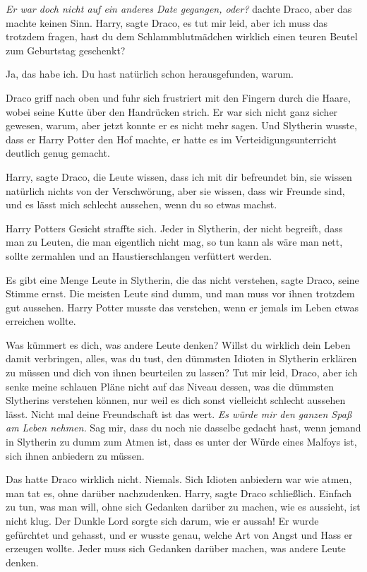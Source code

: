 \emph{Er war doch nicht auf ein anderes Date gegangen, oder? }dachte Draco, aber
das machte keinen Sinn. \glqq Harry\grqq{}, sagte Draco, \glqq es tut mir leid,
aber ich muss das trotzdem fragen, hast du dem Schlammblutmädchen wirklich einen
teuren Beutel zum Geburtstag geschenkt?\grqq{}

\glqq Ja, das habe ich. Du hast natürlich schon herausgefunden, warum.\grqq{}

Draco griff nach oben und fuhr sich frustriert mit den Fingern durch die Haare,
wobei seine Kutte über den Handrücken strich. Er war sich nicht ganz sicher
gewesen, warum, aber jetzt konnte er es nicht mehr sagen. Und Slytherin wusste,
dass er Harry Potter den Hof machte, er hatte es im Verteidigungsunterricht
deutlich genug gemacht.

\glqq Harry\grqq{}, sagte Draco, \glqq die Leute wissen, dass ich mit dir
befreundet bin, sie wissen natürlich nichts von der Verschwörung, aber sie
wissen, dass wir Freunde sind, und es lässt mich schlecht aussehen, wenn du so
etwas machst.\grqq{}

Harry Potters Gesicht straffte sich. \glqq Jeder in Slytherin, der nicht
begreift, dass man zu Leuten, die man eigentlich nicht mag, so tun kann als wäre
man nett, sollte zermahlen und an Haustierschlangen verfüttert werden.\grqq{}

\glqq Es gibt eine Menge Leute in Slytherin, die das nicht verstehen\grqq{},
sagte Draco, seine Stimme ernst. \glqq Die meisten Leute sind dumm, und man muss
vor ihnen trotzdem gut aussehen.\grqq{} Harry Potter musste das verstehen, wenn
er jemals im Leben etwas erreichen wollte.

\glqq Was kümmert es dich, was andere Leute denken? Willst du wirklich dein
Leben damit verbringen, alles, was du tust, den dümmsten Idioten in Slytherin
erklären zu müssen und dich von ihnen beurteilen zu lassen? Tut mir leid, Draco,
aber ich senke meine schlauen Pläne nicht auf das Niveau dessen, was die
dümmsten Slytherins verstehen können, nur weil es dich sonst vielleicht schlecht
aussehen lässt. Nicht mal deine Freundschaft ist das wert. \emph{Es würde mir
den ganzen Spaß am Leben nehmen.} Sag mir, dass du noch nie dasselbe gedacht
hast, wenn jemand in Slytherin zu dumm zum Atmen ist, dass es unter der Würde
eines Malfoys ist, sich ihnen anbiedern zu müssen.\grqq{}

Das hatte Draco wirklich nicht. Niemals. Sich Idioten anbiedern war wie atmen,
man tat es, ohne darüber nachzudenken. \glqq Harry\grqq{}, sagte Draco
schließlich. \glqq Einfach zu tun, was man will, ohne sich Gedanken darüber zu
machen, wie es aussieht, ist nicht klug. Der Dunkle Lord sorgte sich darum, wie
er aussah! Er wurde gefürchtet und gehasst, und er wusste genau, welche Art von
Angst und Hass er erzeugen wollte. Jeder muss sich Gedanken darüber machen, was
andere Leute denken.\grqq{}

